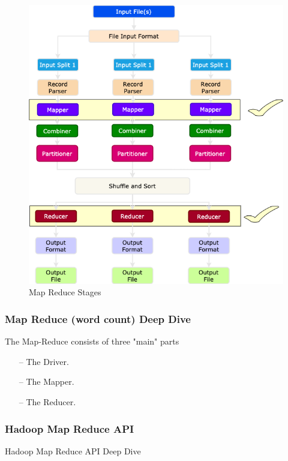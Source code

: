 \begin{frame}
	
	\begin{figure}
		\includegraphics[height=.925\textheight]{./Figures/chapter-02/Map-Reduce_2.png}
		\caption{Map Reduce Stages } \label{fig:MRSteps2}
	\end{figure}			
\end{frame}
\begin{frame}[c]{ }
	\frametitle{Map Reduce (word count) Deep Dive }
	
	The Map-Reduce consists of three "main" parts
	
	\begin{itemize}  [<+->]
		\item [--] The Driver.
		\item [--] The Mapper.
		\item [--] The Reducer.
		
	\end{itemize}
\end{frame}
\begin{frame}[c]{ }
	\frametitle{ Hadoop Map Reduce API}
	\centering     
	
	\textcolor{offgreen}{ \large Hadoop Map Reduce API Deep Dive}
\end{frame}
